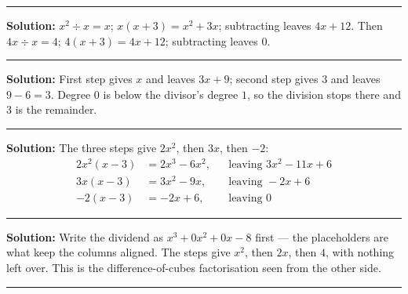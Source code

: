 \documentclass[12pt]{article}
\begin{document}



\vspace{0.3cm}
\noindent\rule{\linewidth}{0.4pt}
\vspace{0.2cm}


\textbf{Solution:} $x^{2} \div x = x$; $x(x + 3) = x^{2} + 3x$; subtracting
leaves $4x + 12$. Then $4x \div x = 4$; $4(x + 3) = 4x + 12$; subtracting leaves
$0$. 

\vspace{0.15cm}
\noindent\rule{\linewidth}{0.2pt}


\textbf{Solution:} First step gives $x$ and leaves $3x + 9$; second step gives
$3$ and leaves $9 - 6 = 3$. Degree $0$ is below the divisor's degree $1$, so the
division stops there and $3$ is the remainder.

\vspace{0.15cm}
\noindent\rule{\linewidth}{0.2pt}


\textbf{Solution:} The three steps give $2x^{2}$, then $3x$, then $-2$:
\begin{align*}
  2x^{2}(x - 3) &= 2x^{3} - 6x^{2}, &&\text{leaving } 3x^{2} - 11x + 6 \\
  3x(x - 3)     &= 3x^{2} - 9x,     &&\text{leaving } -2x + 6 \\
  -2(x - 3)     &= -2x + 6,         &&\text{leaving } 0
\end{align*}

\vspace{0.15cm}
\noindent\rule{\linewidth}{0.2pt}


\textbf{Solution:} Write the dividend as $x^{3} + 0x^{2} + 0x - 8$ first --- the
placeholders are what keep the columns aligned. The steps give $x^{2}$, then
$2x$, then $4$, with nothing left over. This is the difference-of-cubes
factorisation seen from the other side. 

\vspace{0.15cm}
\noindent\rule{\linewidth}{0.2pt}

\end{document}
